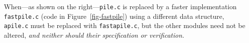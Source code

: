 \documentclass[runningheads,orivec]{llncs}
\begin{document}
When---as shown on the right---\lstinline{pile.c} is replaced by a
faster implementation \lstinline{fastpile.c} (code in
Figure~\ref{fig-fastpile}) using a different data structure,
\lstinline{apile.c} must be replaced with \lstinline{fastapile.c}, but
the other modules need not be altered, \emph{and neither should their
  specification or verification.}


\end{document}
